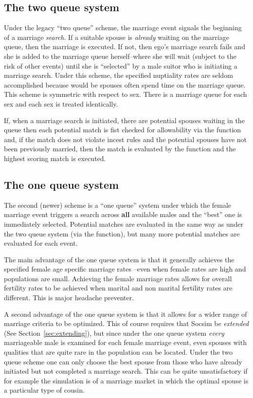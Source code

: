 \subsection{The two queue system}

Under the legacy ``two queue'' scheme, the marriage event signals the
beginning of a marriage \emph{search}. If a suitable spouse is
\emph{already} waiting on the marriage queue, then the marriage is
executed. If not, then ego's marriage search fails and she is added to
the marriage queue herself--where she will wait (subject to the risk
of other events) until she is ``selected'' by a male suitor who is
initiating a marriage search.  Under this scheme, the specified
nuptiality rates are seldom accomplished because would be spouses
often spend time on the marriage queue.  This scheme is symmetric with
respect to sex. There is a marriage queue for each sex and each sex is
treated identically.

If, when a marriage search is initiated, there are potential spouses
waiting in the queue then each potential match is fist checked for
allowability via the  function and, if the
match does not violate incest rules and the potential spouses have not
been previously married, then the match is evaluated by the
 function and the highest scoring match is executed.


\subsection{The one queue system}
\label{sec:oneq}

The second (newer) scheme is a ``one queue'' system under which the female
marriage event triggers a search across \textbf{all} available males
and the ``best'' one is immediately selected. Potential matches are
evaluated in the same way as under the two queue system (via the
 function), but many
more potential matches are evaluated for each event.

The main advantage of the one queue system is that it generally
achieves the specified female age specific marriage rates --even when
female rates are high and populations are small. Achieving the female
marriage rates allows for overall fertility rates to be achieved when
marital and non marital fertility rates are different. This is major
headache preventer.

A second advantage of the one queue system is that it allows for a
wider range of marriage criteria to be optimized. This of course requires
that Socsim be \emph{extended} (See Section~\ref{sec:extending}), but
since under the one queue system \emph{every} marriageable male is
examined for each female marriage event, even spouses with qualities
that are quite rare in the population can be located.  Under the two
queue scheme one can only choose the best spouse from those who have
already initiated but not completed a marriage search. This can be
quite unsatisfactory if for example the simulation is of a marriage
market in which the optimal spouse is a particular type of cousin.


